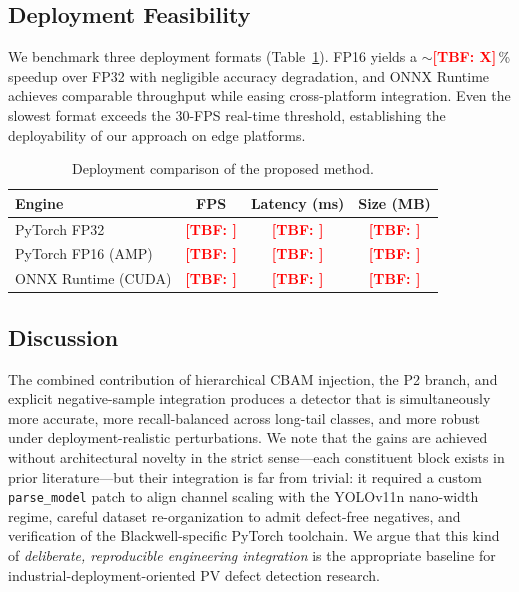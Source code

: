 \documentclass[journal,onecolumn,11pt]{IEEEtran}
\newcommand{\TBF}[1]{\textcolor{red}{\textbf{[TBF: #1]}}} %
\begin{document}
\subsection{Deployment Feasibility}
\label{sec:deploy}
We benchmark three deployment formats (Table~\ref{tab:deploy}). FP16 yields a $\sim$\TBF{X}\,\% speedup over FP32 with negligible accuracy degradation, and ONNX Runtime achieves comparable throughput while easing cross-platform integration. Even the slowest format exceeds the 30-FPS real-time threshold, establishing the deployability of our approach on edge platforms.

\begin{table}[!t]
\caption{Deployment comparison of the proposed method.}
\label{tab:deploy}
\centering
\renewcommand{\arraystretch}{1.2}
\begin{tabular}{@{}lccc@{}}
\toprule
Engine & FPS & Latency (ms) & Size (MB) \\
\midrule
PyTorch FP32         & \TBF{} & \TBF{} & \TBF{} \\
PyTorch FP16 (AMP)   & \TBF{} & \TBF{} & \TBF{} \\
ONNX Runtime (CUDA)  & \TBF{} & \TBF{} & \TBF{} \\
\bottomrule
\end{tabular}
\end{table}

\subsection{Discussion}
\label{sec:discussion}
The combined contribution of hierarchical CBAM injection, the P2 branch, and explicit negative-sample integration produces a detector that is simultaneously more accurate, more recall-balanced across long-tail classes, and more robust under deployment-realistic perturbations. We note that the gains are achieved without architectural novelty in the strict sense---each constituent block exists in prior literature---but their integration is far from trivial: it required a custom \texttt{parse\_model} patch to align channel scaling with the YOLOv11n nano-width regime, careful dataset re-organization to admit defect-free negatives, and verification of the Blackwell-specific PyTorch toolchain. We argue that this kind of \emph{deliberate, reproducible engineering integration} is the appropriate baseline for industrial-deployment-oriented PV defect detection research.

\end{document}
